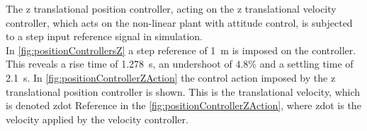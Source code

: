 \begin{minipage}{\linewidth}
\begin{minipage}{0.45\linewidth}
\begin{figure}[H]
            \centering
            \label{fig:velocityControllerZAction}
        \end{figure}
    \end{minipage}
\end{minipage}

The z translational position controller, acting on the z translational velocity controller, which acts on the non-linear plant with attitude control, is subjected to a step input reference signal in simulation.\\
In \autoref{fig:positionControllersZ} a step reference of \SI{1}{m} is imposed on the controller. This reveals a rise time of \SI{1.278}{s}, an undershoot of  $4.8 \%$ and a settling time of \SI{2.1}{s}. In \autoref{fig:positionControllerZAction} the control action imposed by the z translational position controller is shown. This is the translational velocity, which is denoted zdot Reference in the \autoref{fig:positionControllerZAction}, where zdot is the velocity applied by the velocity controller.

